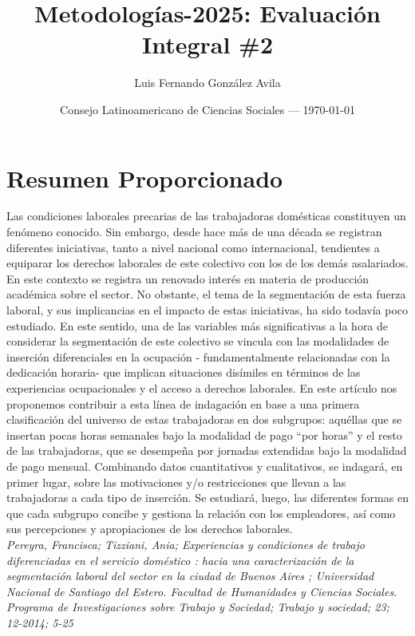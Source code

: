 \documentclass{article}
\title{Metodologías-2025: Evaluación Integral \#2} %
\author{Luis Fernando González Avila} %
\date{Consejo Latinoamericano de Ciencias Sociales --- \today} %
\begin{document}
\maketitle %

\section*{Resumen Proporcionado}

\begin{scriptsize}
	
Las condiciones laborales precarias de las trabajadoras domésticas constituyen un fenómeno conocido. Sin embargo, desde hace más de una década se registran diferentes iniciativas, tanto a nivel nacional como internacional, tendientes a equiparar los derechos laborales de este colectivo con los de los demás asalariados. En este contexto se registra un renovado interés en materia de producción académica sobre el sector. No obstante, el tema de la segmentación de esta fuerza laboral, y sus implicancias en el impacto de estas iniciativas, ha sido todavía poco estudiado. En este sentido, una de las variables más significativas a la hora de considerar la segmentación de este colectivo se vincula con las modalidades de inserción diferenciales en la ocupación - fundamentalmente relacionadas con la dedicación horaria- que implican situaciones disímiles en términos de las experiencias ocupacionales y el acceso a derechos laborales. En este artículo nos proponemos contribuir a esta línea de indagación en base a una primera clasificación del universo de estas trabajadoras en dos subgrupos: aquéllas que se insertan pocas horas semanales bajo la modalidad de pago “por horas” y el resto de las trabajadoras, que se desempeña por jornadas extendidas bajo la modalidad de pago mensual. Combinando datos cuantitativos y cualitativos, se indagará, en primer lugar, sobre las motivaciones y/o restricciones que llevan a las trabajadoras a cada tipo de inserción. Se estudiará, luego, las diferentes formas en que cada subgrupo concibe y gestiona la relación con los empleadores, así como sus percepciones y apropiaciones de los derechos laborales.\\

\noindent\textit{Pereyra, Francisca; Tizziani, Ania; Experiencias y condiciones de trabajo diferenciadas en el servicio doméstico : hacia una caracterización de la segmentación laboral del sector en la ciudad de Buenos Aires ; Universidad Nacional de Santiago del Estero. Facultad de Humanidades y Ciencias Sociales. Programa de Investigaciones sobre Trabajo y Sociedad; Trabajo y sociedad; 23; 12-2014; 5-25}
	
\end{scriptsize}
\end{document}
